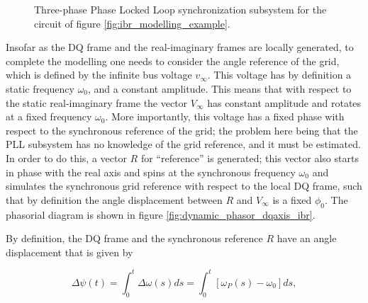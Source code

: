 \begin{example}
\begin{figure}
{
}
\caption{Three-phase Phase Locked Loop synchronization subsystem for the circuit of figure \ref{fig:ibr_modelling_example}.}
\label{fig:3p_pll_curr_control}
\end{figure}

	Insofar as the DQ frame and the real-imaginary frames are locally generated, to complete the modelling one needs to consider the angle reference of the grid, which is defined by the infinite bus voltage $v_\infty$. This voltage has by definition a static frequency $\omega_0$, and a constant amplitude. This means that with respect to the static real-imaginary frame the vector $V_\infty$ has constant amplitude and rotates at a fixed frequency $\omega_0$. More importantly, this voltage has a fixed phase with respect to the synchronous reference of the grid; the problem here being that the PLL subsystem has no knowledge of the grid reference, and it must be estimated. In order to do this, a vector $R$ for ``reference'' is generated; this vector also starts in phase with the real axis and spins at the synchronous frequency $\omega_0$ and simulates the synchronous grid reference with respect to the local DQ frame, such that by definition the angle displacement between $R$ and $V_\infty$ is a fixed $\phi_0$.	The phasorial diagram is shown in figure \ref{fig:dynamic_phasor_dqaxis_ibr}.

	By definition, the DQ frame and the synchronous reference $R$ have an angle displacement that is given by 

\begin{equation} \Delta\psi(t) = \int_0^t \Delta\omega(s) ds = \int_0^t \left[\omega_P(s) - \omega_0\right]ds, \end{equation}


\end{example}
